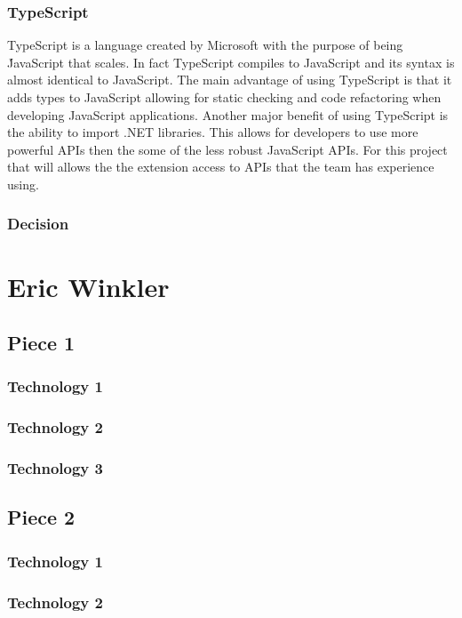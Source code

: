 \documentclass[letterpaper,10pt,titlepage,draftclsnofoot,onecolumn,onesided] {IEEEtran}
\begin{document}
\subsubsection{TypeScript}
TypeScript is a language created by Microsoft with the purpose of being \'JavaScript that scales.\' \cite{TypeScript}
In fact TypeScript compiles to JavaScript and its syntax is almost identical to JavaScript. 
The main advantage of using TypeScript is that it adds types to JavaScript allowing for static checking and code refactoring when developing JavaScript applications. \cite{TypeScript}
Another major benefit of using TypeScript is the ability to import .NET libraries. 
This allows for developers to use more powerful APIs then the some of the less robust JavaScript APIs. 
For this project that will allows the the extension access to APIs that the team has experience using.
\subsubsection{Decision}


\section{Eric Winkler}
\subsection{Piece 1}
\subsubsection{Technology 1}
\subsubsection{Technology 2}
\subsubsection{Technology 3}

\subsection{Piece 2}
\subsubsection{Technology 1}
\subsubsection{Technology 2}
\end{document}
